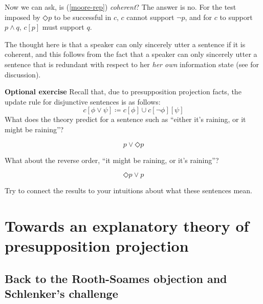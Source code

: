 \documentclass[nols,twoside,nofonts,nobib,nohyper]{tufte-handout}
\theoremstyle{definition}
\begin{document}
Now we can ask, is (\ref{moore-rep}) \textit{coherent}? The answer is no. For the test imposed by $◇ p$ to be successful in $c$, $c$ cannot support $¬ p$, and for $c$ to support $p ∧ q$, $c[p]$ must support $q$.

The thought here is that a speaker can only sincerely utter a sentence if it is coherent, and this follows from the fact that a speaker can only sincerely utter a sentence that is redundant with respect to her \textit{her own} information state (see \citealt{GroenendijkEtAl1996} for discussion).

\begin{tcolorbox}
  \textbf{Optional exercise}
  \tcblower
Recall that, due to presupposition projection facts, the update rule for disjunctive sentences is as follows:
$$
c[ϕ ∨ ψ] ≔ c[ϕ] ∪ c[¬ ϕ][ψ]
$$
What does the theory predict for a sentence such as \enquote{either it's raining, or it might be raining}?

$$
p ∨ ◇ p
$$

What about the reverse order, \enquote{it might be raining, or it's raining}?

$$
◇ p ∨ p
$$

Try to connect the results to your intuitions about what these sentences mean.
\end{tcolorbox}

\section{Towards an explanatory theory of presupposition projection}

\subsection{Back to the Rooth-Soames objection and Schlenker's challenge}
\end{document}
